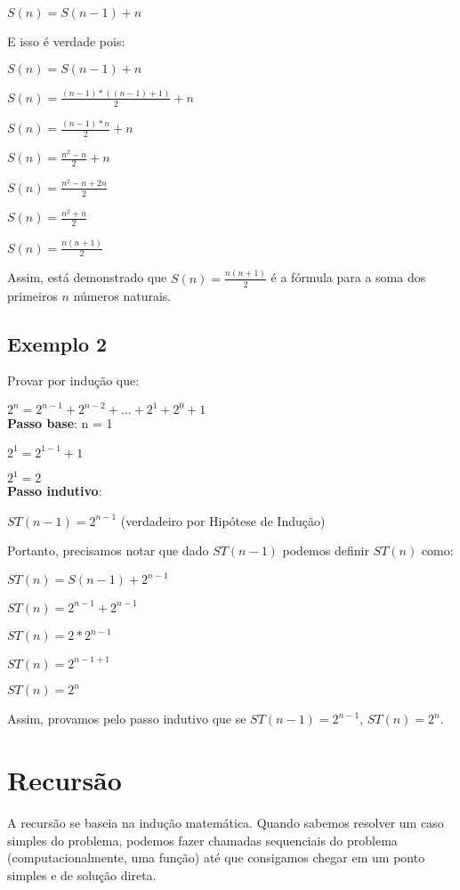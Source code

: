 \documentclass[a4paper, twocolumn]{article}
\theoremstyle{definition}
\begin{document}
	$S(n) = S(n-1) + n$
	
	E isso é verdade pois:
	
	$S(n) = S(n-1) + n$
	
	$S(n) = \frac{(n-1) * ((n-1)+1)}{2} + n$
	
	$S(n) = \frac{(n-1) * n}{2} + n$
	
	$S(n) = \frac{n^2-n}{2} + n$
	
	$S(n) = \frac{n^2-n + 2n}{2}$
	
	$S(n) = \frac{n^2 + n}{2}$
	
	$S(n) = \frac{n(n + 1)}{2}$
	
	Assim, está demonstrado que $S(n) = \frac{n(n + 1)}{2}$ é a fórmula para a soma dos primeiros $n$ números naturais.

\subsection{Exemplo 2}
	Provar por indução que:
	
	$2^n = 2^{n-1} + 2^{n-2} + ... + 2^1 + 2^0 + 1$ \\
	
	\textbf{Passo base}: n = 1
	
	$2^1 = 2^{1-1} + 1$
	
	$2^1 = 2$ \\
	
	\textbf{Passo indutivo}:
	
	$ST(n-1) = 2^{n-1}$ (verdadeiro por Hipótese de Indução)
	
	Portanto, precisamos notar que dado $ST(n-1)$ podemos definir $ST(n)$ como:
	
	$ST(n) = S(n-1) + 2^{n-1}$
	
	$ST(n) = 2^{n-1} + 2^{n-1}$
	
	$ST(n) = 2*2^{n-1}$
	
	$ST(n) = 2^{n-1+1}$
	
	$ST(n) = 2^n$
	
	Assim, provamos pelo passo indutivo que se $ST(n-1) = 2^{n-1}$, $ST(n) = 2^n$.

\section{Recursão}
A recursão se baseia na indução matemática. Quando sabemos resolver um caso simples do problema, podemos fazer chamadas sequenciais do problema (computacionalmente, uma função) até que consigamos chegar em um ponto simples e de solução direta.
\end{document}
